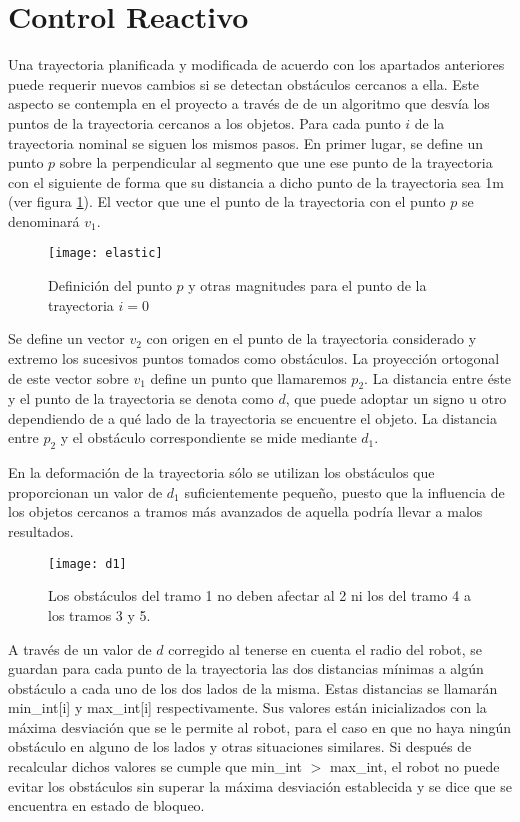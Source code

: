 \section{Control Reactivo}\label{reactivo}

Una trayectoria planificada y modificada de acuerdo con los apartados anteriores puede requerir nuevos cambios si se detectan obstáculos cercanos a ella. Este aspecto se contempla en el proyecto a través de de un algoritmo que desvía los puntos de la trayectoria cercanos a los objetos. Para cada punto $i$ de la trayectoria nominal se siguen los mismos pasos. En primer lugar, se define un punto $p$ sobre la perpendicular al segmento que une ese punto de la trayectoria con el siguiente de forma que su distancia a dicho punto de la trayectoria sea 1m (ver figura \ref{fg:elastic}). El vector que une el punto de la trayectoria con el punto $p$ se denominará $v_{1}$.

\begin{figure}[h]
  \centering\texttt{[image: elastic]}\\
  \caption{Definición del punto $p$ y otras magnitudes para el punto de la trayectoria $i = 0$}\label{fg:elastic}
\end{figure}

Se define un vector $v_{2}$ con origen en el punto de la trayectoria considerado y extremo los sucesivos puntos tomados como obstáculos. La proyección ortogonal de este vector sobre $v_{1}$ define un punto que llamaremos $p_{2}$. La distancia entre éste y el punto de la trayectoria se denota como $d$, que puede adoptar un signo u otro dependiendo de a qué lado de la trayectoria se encuentre el objeto. La distancia entre $p_{2}$ y el obstáculo correspondiente se mide mediante $d_{1}$.

En la deformación de la trayectoria sólo se utilizan los obstáculos que proporcionan un valor de $d_{1}$ suficientemente pequeño, puesto que la influencia de los objetos cercanos a tramos más avanzados de aquella podría llevar a malos resultados.

\begin{figure}[h]
  \centering\texttt{[image: d1]}\\
  \caption{Los obstáculos del tramo 1 no deben afectar al 2 ni los del tramo 4 a los tramos 3 y 5.}\label{fg:d1}
\end{figure}

A través de un valor de $d$ corregido al tenerse en cuenta el radio del robot, se guardan para cada punto de la trayectoria las dos distancias mínimas a algún obstáculo a cada uno de los dos lados de la misma. Estas distancias se llamarán min\_int[i] y max\_int[i] respectivamente. Sus valores están inicializados con la máxima desviación que se le permite al robot, para el caso en que no haya ningún obstáculo en alguno de los lados y otras situaciones similares. Si después de recalcular dichos valores se cumple que min\_int $>$ max\_int, el robot no puede evitar los obstáculos sin superar la máxima desviación establecida y se dice que se encuentra en estado de bloqueo.

